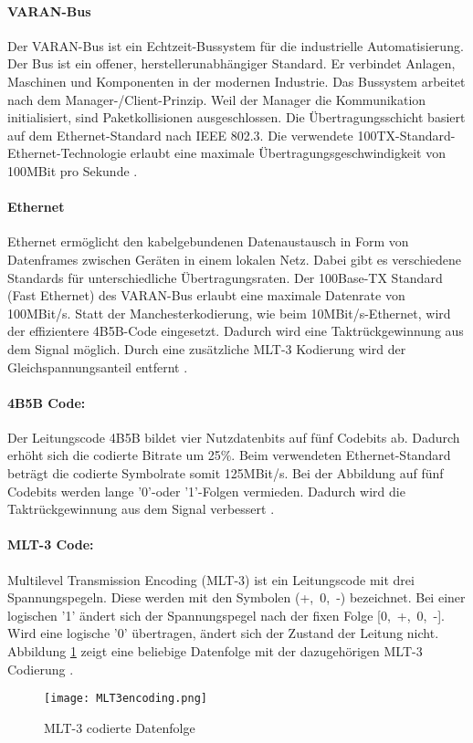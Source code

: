 \paragraph{VARAN-Bus}
Der VARAN-Bus ist ein Echtzeit-Bussystem für die industrielle Automatisierung. Der Bus ist ein offener, herstellerunabhängiger Standard. Er verbindet Anlagen, Maschinen und Komponenten in der modernen Industrie. Das Bussystem arbeitet nach dem Manager-/Client-Prinzip. Weil der Manager die Kommunikation initialisiert, sind Paketkollisionen ausgeschlossen. Die Übertragungsschicht basiert auf dem Ethernet-Standard nach IEEE 802.3. Die verwendete 100TX-Standard-Ethernet-Technologie erlaubt eine maximale Übertragungsgeschwindigkeit von 100MBit pro Sekunde \cite{varan-bus}.

\paragraph{Ethernet}
Ethernet ermöglicht den kabelgebundenen Datenaustausch in Form von Datenframes zwischen Geräten in einem lokalen Netz. Dabei gibt es verschiedene Standards für unterschiedliche Übertragungsraten. Der 100Base-TX Standard (Fast Ethernet) des VARAN-Bus erlaubt eine maximale Datenrate von 100MBit/s. Statt der Manchesterkodierung, wie beim 10MBit/s-Ethernet, wird der effizientere 4B5B-Code eingesetzt. Dadurch wird eine Taktrückgewinnung aus dem Signal möglich. Durch eine zusätzliche MLT-3 Kodierung wird der Gleichspannungsanteil entfernt \cite{ethernet}.

\paragraph{4B5B Code:}
Der Leitungscode 4B5B bildet vier Nutzdatenbits auf fünf Codebits ab. Dadurch erhöht sich die codierte Bitrate um 25\%. Beim verwendeten Ethernet-Standard beträgt die codierte Symbolrate somit 125MBit/s. Bei der Abbildung auf fünf Codebits werden lange '0'-oder '1'-Folgen vermieden. Dadurch wird die Taktrückgewinnung aus dem Signal verbessert \cite{4b5b}.

\paragraph{MLT-3 Code:}
Multilevel Transmission Encoding (MLT-3) ist ein Leitungscode mit drei Spannungspegeln. Diese werden mit den Symbolen (+,\ 0,\ -) bezeichnet. Bei einer logischen '1' ändert sich der Spannungspegel nach der fixen Folge [0,\ +,\ 0,\ -]. Wird eine logische '0' übertragen, ändert sich der Zustand der Leitung nicht. Abbildung \ref{fig:MLT3code} zeigt eine beliebige Datenfolge mit der dazugehörigen MLT-3 Codierung \cite{MLT-3}.
\begin{figure}[h]
\centering
\texttt{[image: MLT3encoding.png]}
\caption{MLT-3 codierte Datenfolge \cite{MLT-3Bild}}\label{fig:MLT3code}
\end{figure}

